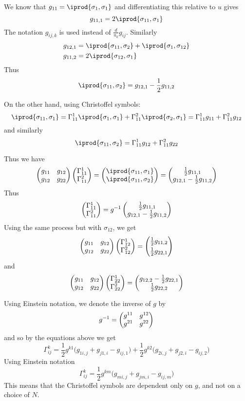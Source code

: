 We know that $g_{11}=\iprod{\sigma_1,\sigma_1}$ and differentiating this relative to $u$ gives
\[ g_{11,1} = 2\iprod{\sigma_{11},\sigma_1} \]
The notation $g_{ij,k}$ is used instead of $\frac d{u_k}g_{ij}$.
Similarly
\begin{align*}
    g_{12,1} &= \iprod{\sigma_{11},\sigma_2} + \iprod{\sigma_1,\sigma_{12}} \\
    g_{11,2} &= 2\iprod{\sigma_{12},\sigma_1} \\
\end{align*}
Thus
\[ \iprod{\sigma_{11},\sigma_2} = g_{12,1} - \frac12g_{11,2} \]

On the other hand, using Christoffel symbols:
\[ \iprod{\sigma_{11},\sigma_1} = \Gamma_{11}^1\iprod{\sigma_1,\sigma_1} + \Gamma_{11}^2\iprod{\sigma_2,\sigma_1} = \Gamma_{11}^1g_{11} + \Gamma_{11}^2g_{12} \]
and similarly
\[ \iprod{\sigma_{11},\sigma_2} = \Gamma_{11}^1g_{12} + \Gamma_{11}^2g_{22} \]

Thus we have
\[ \pmat{g_{11} & g_{12} \\ g_{12} & g_{22}}\pmat{\Gamma_{11}^1 \\ \Gamma_{11}^2} = \pmat{\iprod{\sigma_{11},\sigma_1} \\ \iprod{\sigma_{11},\sigma_2}} =
\pmat{\frac12g_{11,1} \\ g_{12,1} - \frac12g_{11,2}} \]
Thus
\[ \begin{pmatrix}\Gamma_{11}^1 \\ \Gamma_{11}^2\end{pmatrix} = g^{-1}\begin{pmatrix}\frac12g_{11,1} \\ g_{12,1}-\frac12g_{11,2}\end{pmatrix} \]
Using the same process but with $\sigma_{12}$, we get
\[ \begin{pmatrix}g_{11} & g_{12} \\ g_{12} & g_{22}\end{pmatrix}\begin{pmatrix}\Gamma_{12}^1 \\ \Gamma_{12}^2\end{pmatrix} = \begin{pmatrix}\frac12g_{11,2} \\[3pt] \frac12g_{22,1}\end{pmatrix} \]
and
\[ \begin{pmatrix}g_{11} & g_{12} \\ g_{12} & g_{22}\end{pmatrix}\begin{pmatrix}\Gamma_{22}^1 \\ \Gamma_{22}^2\end{pmatrix} = \begin{pmatrix}g_{12,2} - \frac12g_{22,1} \\ \frac12g_{22,2}\end{pmatrix} \]

Using Einstein notation, we denote the inverse of $g$ by
\[ g^{-1} = \begin{pmatrix}g^{11} & g^{12} \\ g^{21} & g^{22}\end{pmatrix} \]
and so by the equations above we get
\[ \Gamma^k_{ij} = \frac12g^{k1}\bigl(g_{1i,j} + g_{j1,i} - g_{ij,1}\bigr) + \frac12g^{k2}\bigl(g_{2i,j} + g_{j2,i} - g_{ij,2}\bigr) \]
Using Einstein notation
\[ \Gamma^k_{ij} = \frac12g^{km}\bigl(g_{mi,j} + g_{jm,i} - g_{ij,m}\bigr) \]
This means that the Christoffel symbols are dependent only on $g$, and not on a choice of $N$.

